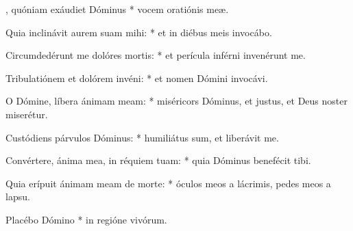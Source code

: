 \begin{psalmus}

, quóniam exáudiet Dóminus * vocem oratiónis meæ.

Quia inclinávit aurem suam mihi: * et in diébus meis invocábo.

Circumdedérunt me dolóres mortis: * et perícula inférni invenérunt me.

Tribulatiónem et dolórem invéni: * et nomen Dómini invocávi.

O Dómine, líbera ánimam meam: * miséricors Dóminus, et justus, et Deus noster miserétur.

Custódiens párvulos Dóminus: * humiliátus sum, et liberávit me.

Convértere, ánima mea, in réquiem tuam: * quia Dóminus benefécit tibi.

Quia erípuit ánimam meam de morte: * óculos meos a lácrimis, pedes meos a lapsu.

Placébo Dómino * in regióne vivórum.

\end{psalmus}
